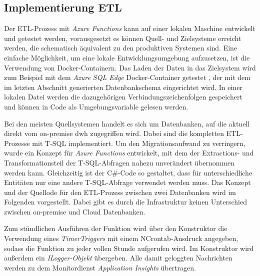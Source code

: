 \subsection{Implementierung ETL}
Der ETL-Prozess mit \textit{Azure Functions} kann auf einer lokalen Maschine entwickelt und getestet werden, vorausgesetzt es können Quell- und Zielsysteme erreicht werden, die schematisch äquivalent zu den produktiven Systemen sind. Eine einfache Möglichkeit, um eine lokale Entwicklungsumgebung aufzusetzen, ist die Verwendung von Docker-Containern. Das Laden der Daten in das Zielsystem wird zum Beispiel mit dem \textit{Azure SQL Edge} Docker-Container getestet \cite[vgl.][]{msdoc_22_sql_docker}, der mit dem im letzten Abschnitt generierten Datenbankschema eingerichtet wird. In einer lokalen Datei werden die dazugehörigen Verbindungszeichenfolgen gespeichert und können in Code als Umgebungsvariable gelesen werden.

Bei den meisten Quellsystemen handelt es sich um Datenbanken, auf die aktuell direkt vom on-premise \ac{dwh} zugegriffen wird. Dabei sind die kompletten ETL-Prozesse mit T-SQL implementiert. Um den Migrationsaufwand zu verringern, wurde ein Konzept für \textit{Azure Functions} entwickelt, mit dem der Extractions- und Transformationsteil der T-SQL-Abfragen nahezu unverändert übernommen werden kann. Gleichzeitig ist der C\#-Code so gestaltet, dass für unterschiedliche Entitäten nur eine andere T-SQL-Abfrage verwendet werden muss. Das Konzept und der Quellode für den ETL-Prozess zwischen zwei Datenbanken wird im Folgenden vorgestellt. Dabei gibt es durch die Infrastruktur keinen Unterschied zwischen on-premise und Cloud Datenbanken. 

Zum stündlichen Ausführen der Funktion wird über den Konstruktor die Verwendung eines \textit{TimerTriggers} mit einem NCrontab-Ausdruck angegeben, sodass die Funktion zu jeder vollen Stunde aufgerufen wird. Im Konstruktor wird außerdem ein \textit{ILogger-Objekt} übergeben. Alle damit geloggten Nachrichten werden zu dem Monitordienst \textit{Application Insights} übertragen. 

